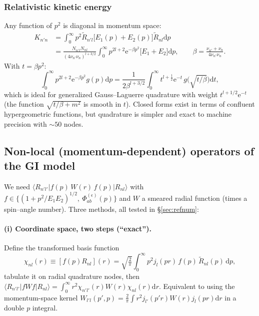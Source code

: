 \documentclass[11pt,a4paper]{article}
\numberwithin{equation}{section}
\theoremstyle{definition}
\theoremstyle{plain}
\theoremstyle{remark}
\numberwithin{algorithm}{section}
\newcommand{\dd}{\mathrm{d}}
\newcommand{\ee}{\mathrm{e}}
\newcommand{\ME}[3]{\langle #1|#2|#3\rangle}
\begin{document}
\subsubsection{Relativistic kinetic energy}
Any function of $p^2$ is diagonal in momentum space:
\begin{equation}
\begin{split}
K_{n'n}&=\int_0^\infty p^2\tilde R_{n'l}\big[E_1(p)+E_2(p)\big]\tilde R_{nl}\dd p\\
&=\frac{N_{n'l}N_{nl}}{(4\nu_{n'}\nu_n)^{l+3/2}}\int_0^\infty p^{2l+2}\ee^{-\beta p^2}\big[E_1+E_2\big]\dd p,\qquad \beta=\frac{\nu_{n'}+\nu_n}{4\nu_{n'}\nu_n}.
\end{split}
\end{equation}
With $t=\beta p^2$:
\begin{equation}
\int_0^\infty p^{2l+2}\ee^{-\beta p^2}g(p)\dd p=\frac{1}{2\beta^{l+3/2}}\int_0^\infty t^{l+\frac12}\ee^{-t}\,g\big(\sqrt{t/\beta}\big)\dd t,
\end{equation}
which is ideal for generalized Gauss--Laguerre quadrature with weight $t^{l+1/2}\ee^{-t}$ (the function $\sqrt{t/\beta+m^2}$ is smooth in $t$). Closed forms exist in terms of confluent hypergeometric functions, but quadrature is simpler and exact to machine precision with $\sim50$ nodes.

\subsection{Non-local (momentum-dependent) operators of the GI model}\label{sec:nonlocal}
We need $\ME{R_{n'l'}}{f(p)\,W(r)\,f(p)}{R_{nl}}$ with $f\in\{(1+p^2/E_1E_2)^{1/2},\ \Phi^{(\epsilon)}_{ab}(p)\}$ and $W$ a smeared radial function (times a spin--angle number). Three methods, all tested in \S\ref{sec:refnum}:

\paragraph{(i) Coordinate space, two steps (``exact'').} Define the transformed basis function
\begin{equation}
\chi_{nl}(r)\equiv[f(p)R_{nl}](r)=\sqrt{\tfrac2\pi}\int_0^\infty p^2j_l(pr)\,f(p)\,\tilde R_{nl}(p)\,\dd p,
\end{equation}
tabulate it on radial quadrature nodes, then $\ME{R_{n'l'}}{fWf}{R_{nl}}=\int_0^\infty r^2\chi_{n'l'}(r)W(r)\chi_{nl}(r)\dd r$.
Equivalent to using the momentum-space kernel $W_{l'l}(p',p)=\frac2\pi\int r^2j_{l'}(p'r)W(r)j_l(pr)\dd r$ in a double $p$ integral.
\end{document}
